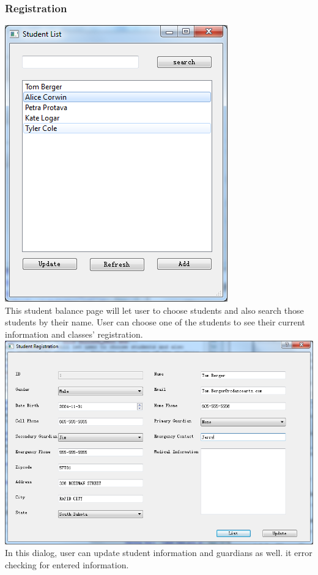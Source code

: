 \subsubsection{Registration}
\includegraphics[scale=0.5]{pics/reg_main.png}\\
This student balance page will let user to choose students and also search those students by their name. User can choose one of the students to see their current information and classes' registration. \\
\includegraphics[scale=0.5]{pics/reg_update.png}\\
In this dialog, user can update student information and guardians as well. it error checking for entered information.\\
